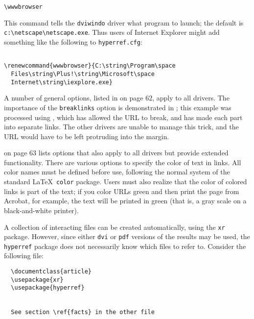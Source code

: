 \begin{verbatim}
\wwwbrowser 
\end{verbatim}

This command tells the \verb|dviwindo| driver what program to launch;
the default is \verb|c:\netscape\netscape.exe|. Thus users of Internet
Explorer might add something like the following to \verb|hyperref.cfg|: 

\begin{verbatim}

\renewcommand{wwwbrowser}{C:\string\Program\space 
  Files\string\Plus!\string\Microsoft\space 
  Internet\string\iexplore.exe} 

\end{verbatim}


A number of general options, listed in  on page 62, apply to all drivers. 
The importance of the \verb|breaklinks| option is demonstrated in ; this 
example was processed using \pdfTEX, which has allowed the URL to break, and 
has made each part into separate links. The other drivers are unable to manage this 
trick, and the URL would have to be left protruding into the margin. 

 on page 63 lists options that also apply to all drivers but
provide extended functionality. There are various options to specify the
color of text in links. All color names must be defined before use,
following the normal system of the standard \LaTeX\ \verb|color|
package. Users must also realize that the color of colored links is part
of the text; if you color URLs green and then print the page from
Acrobat, for example, the text will be printed in green (that is, a gray
scale on a black-and-white printer). 


A collection of interacting files can be created automatically, using
the \verb|xr| package. However, since either \verb|dvi| or \verb|pdf| versions of the results
may be used, the \verb|hyperref| package does not necessarily know which files
to refer to. Consider the following file: 


\begin{verbatim}
  \documentclass{article} 
  \usepackage{xr} 
  \usepackage{hyperref} 
   
   
  See section \ref{facts} in the other file 
   
\end{verbatim}

